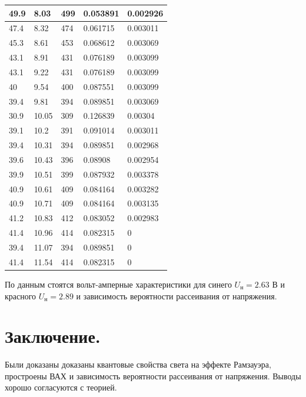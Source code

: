 \documentclass[%
 reprint,
 amsmath,amssymb,
 aps,
]{revtex4-2}
\begin{document}
\begin{table}[h!]
\begin{tabular}{|l|l|l|l|l|}
		49.9      & 8.03     & 499       & 0.053891    & 0.002926    \\ \hline
		47.4      & 8.32     & 474       & 0.061715    & 0.003011    \\ \hline
		45.3      & 8.61     & 453       & 0.068612    & 0.003069    \\ \hline
		43.1      & 8.91     & 431       & 0.076189    & 0.003099    \\ \hline
		43.1      & 9.22     & 431       & 0.076189    & 0.003099    \\ \hline
		40        & 9.54     & 400       & 0.087551    & 0.003099    \\ \hline
		39.4      & 9.81     & 394       & 0.089851    & 0.003069    \\ \hline
		30.9      & 10.05    & 309       & 0.126839    & 0.00304     \\ \hline
		39.1      & 10.2     & 391       & 0.091014    & 0.003011    \\ \hline
		39.4      & 10.31    & 394       & 0.089851    & 0.002968    \\ \hline
		39.6      & 10.43    & 396       & 0.08908     & 0.002954    \\ \hline
		39.9      & 10.51    & 399       & 0.087932    & 0.003378    \\ \hline
		40.9      & 10.61    & 409       & 0.084164    & 0.003282    \\ \hline
		40.9      & 10.71    & 409       & 0.084164    & 0.003135    \\ \hline
		41.2      & 10.83    & 412       & 0.083052    & 0.002983    \\ \hline
		41.4      & 10.96    & 414       & 0.082315    & 0           \\ \hline
		39.4      & 11.07    & 394       & 0.089851    & 0           \\ \hline
		41.4      & 11.54    & 414       & 0.082315    & 0           \\ \hline
	\end{tabular}
\end{table}

По данным стоятся вольт-амперные характеристики для синего $U_\text{н} = 2.63$ В и красного $U_\text{н} = 2.89$ и зависимость вероятности рассеивания от напряжения.

\section{Заключение.}

Были доказаны доказаны квантовые свойства света на эффекте Рамзауэра, простроены ВАХ и зависимость вероятности рассеивания от напряжения. Выводы хорошо согласуются с теорией. 
\end{document}
